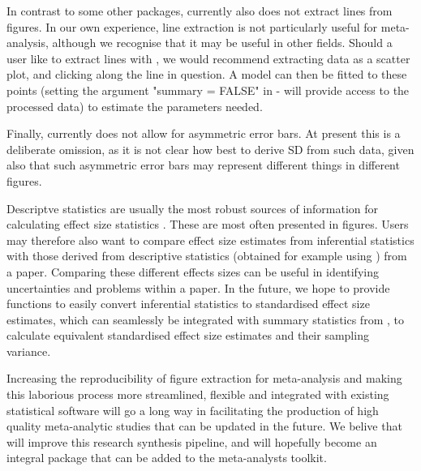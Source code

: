 \documentclass[article]{jss}
\begin{document}
In contrast to some other packages,  currently also does not extract lines from figures. In our own experience, line extraction is not particularly useful for meta-analysis, although we recognise that it may be useful in other fields. Should a user like to extract lines with , we would recommend extracting data as a scatter plot, and clicking along the line in question. A model can then be fitted to these points (setting the argument "summary = FALSE" in  - will provide access to the processed data) to estimate the parameters needed.

Finally,  currently does not allow for asymmetric error bars. At present this is a deliberate omission, as it is not clear how best to derive SD from such data, given also that such asymmetric error bars may represent different things in different figures. 


Descriptve statistics are usually the most robust sources of information for calculating effect size statistics \citep{Noble2017}. These are most often presented in figures. Users may therefore also want to compare effect size estimates from inferential statistics with those derived from descriptive statistics (obtained for example using ) from a paper. Comparing these different effects sizes can be useful in identifying uncertainties and problems within a paper. In the future, we hope to provide functions to easily convert inferential statistics to standardised effect size estimates, which can seamlessly be integrated with summary statistics from , to calculate equivalent standardised effect size estimates and their sampling variance.


Increasing the reproducibility of figure extraction for meta-analysis and making this laborious process more streamlined, flexible and integrated with existing statistical software will go a long way in facilitating the production of high quality meta-analytic studies that can be updated in the future. We belive that  will improve this research synthesis pipeline, and will hopefully become an integral package that can be added to the meta-analysts toolkit.
\end{document}
